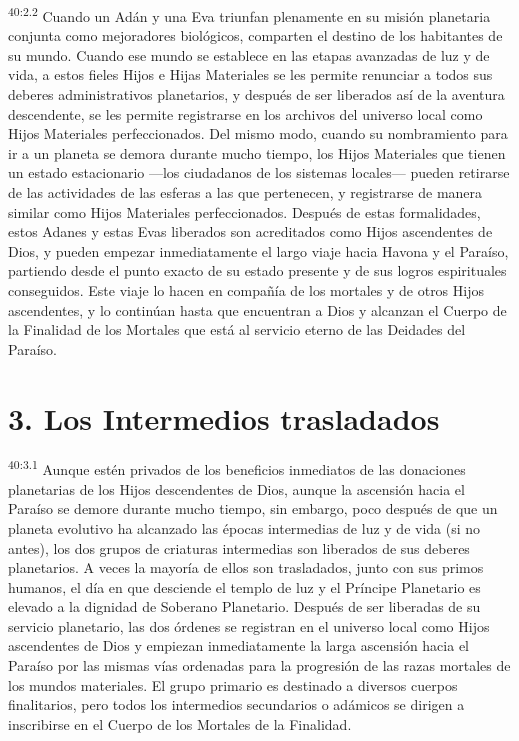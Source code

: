 \par
\textsuperscript{40:2.2} Cuando un Adán y una Eva triunfan plenamente en su misión planetaria conjunta como mejoradores biológicos, comparten el destino de los habitantes de su mundo. Cuando ese mundo se establece en las etapas avanzadas de luz y de vida, a estos fieles Hijos e Hijas Materiales se les permite renunciar a todos sus deberes administrativos planetarios, y después de ser liberados así de la aventura descendente, se les permite registrarse en los archivos del universo local como Hijos Materiales perfeccionados. Del mismo modo, cuando su nombramiento para ir a un planeta se demora durante mucho tiempo, los Hijos Materiales que tienen un estado estacionario ---los ciudadanos de los sistemas locales--- pueden retirarse de las actividades de las esferas a las que pertenecen, y registrarse de manera similar como Hijos Materiales perfeccionados. Después de estas formalidades, estos Adanes y estas Evas liberados son acreditados como Hijos ascendentes de Dios, y pueden empezar inmediatamente el largo viaje hacia Havona y el Paraíso, partiendo desde el punto exacto de su estado presente y de sus logros espirituales conseguidos. Este viaje lo hacen en compañía de los mortales y de otros Hijos ascendentes, y lo continúan hasta que encuentran a Dios y alcanzan el Cuerpo de la Finalidad de los Mortales que está al servicio eterno de las Deidades del Paraíso.

\section*{3. Los Intermedios trasladados}
\par
\textsuperscript{40:3.1} Aunque estén privados de los beneficios inmediatos de las donaciones planetarias de los Hijos descendentes de Dios, aunque la ascensión hacia el Paraíso se demore durante mucho tiempo, sin embargo, poco después de que un planeta evolutivo ha alcanzado las épocas intermedias de luz y de vida (si no antes), los dos grupos de criaturas intermedias son liberados de sus deberes planetarios. A veces la mayoría de ellos son trasladados, junto con sus primos humanos, el día en que desciende el templo de luz y el Príncipe Planetario es elevado a la dignidad de Soberano Planetario. Después de ser liberadas de su servicio planetario, las dos órdenes se registran en el universo local como Hijos ascendentes de Dios y empiezan inmediatamente la larga ascensión hacia el Paraíso por las mismas vías ordenadas para la progresión de las razas mortales de los mundos materiales. El grupo primario es destinado a diversos cuerpos finalitarios, pero todos los intermedios secundarios o adámicos se dirigen a inscribirse en el Cuerpo de los Mortales de la Finalidad.

